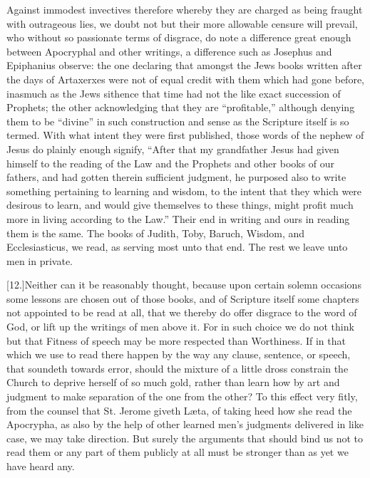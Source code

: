 Against immodest invectives therefore whereby they are charged as being fraught with outrageous lies, we doubt not but their more allowable censure will prevail, who without so passionate terms of disgrace, do note a difference great enough between Apocryphal and other writings, a difference such as Josephus and Epiphanius observe: the one declaring that amongst the Jews books written after the days of Artaxerxes were not of equal credit with them which had gone before, inasmuch as the Jews sithence that time had not the like exact succession of Prophets; the other acknowledging that  they are “profitable,” although denying them to be “divine” in such construction and sense as the Scripture itself is so termed.
 With what intent they were first published, those words of the nephew of Jesus do plainly enough signify, “After that my grandfather Jesus had given himself to the reading of the Law and the Prophets and other books of our fathers, and had gotten therein sufficient judgment, he purposed also to write something pertaining to learning and wisdom, to the intent that they which were desirous to learn, and would give themselves to these things, might profit much more in living according to the Law.” Their end in writing and ours in reading them is the same. The books of Judith, Toby, Baruch, Wisdom, and Ecclesiasticus, we read, as serving most unto that end. The rest we leave unto men in private.

[12.]Neither can it be reasonably thought, because upon certain solemn occasions some lessons are chosen out of those books, and of Scripture itself some chapters not appointed to be read at all, that we thereby do offer disgrace to the word of God, or lift up the writings of men above it. For in such choice we do not think but that Fitness of speech may be more respected than Worthiness. If in that which we use to read there happen by the way any clause, sentence, or speech, that soundeth towards error, should the mixture of a little dross constrain the Church to deprive herself of so much gold, rather than learn how by art and judgment to make separation of the one from the other? To this effect very fitly, from the counsel that St. Jerome giveth Læta, of taking heed how she read the Apocrypha, as also by the help of other learned men’s judgments delivered in like case, we may take direction. But surely the arguments that should bind us not to read them or any part of them publicly at all must be stronger than as yet we have heard any.




